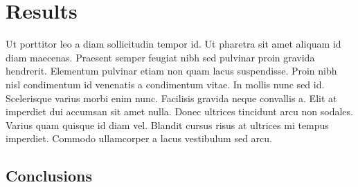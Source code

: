 \chapter{Results}
Ut porttitor leo a diam sollicitudin tempor id. Ut pharetra sit amet aliquam id diam maecenas. Praesent semper feugiat nibh sed pulvinar proin gravida hendrerit. Elementum pulvinar etiam non quam lacus suspendisse. Proin nibh nisl condimentum id venenatis a condimentum vitae. In mollis nunc sed id. Scelerisque varius morbi enim nunc. Facilisis gravida neque convallis a. Elit at imperdiet dui accumsan sit amet nulla. Donec ultrices tincidunt arcu non sodales. Varius quam quisque id diam vel. Blandit cursus risus at ultrices mi tempus imperdiet. Commodo ullamcorper a lacus vestibulum sed arcu. 

\section{Conclusions}